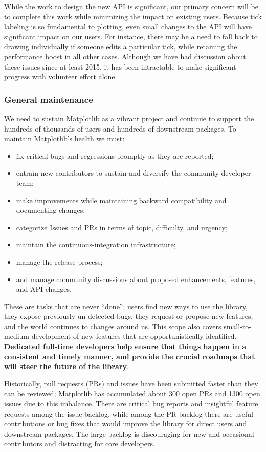 \documentclass[12pt]{article}
\numberwithin{page}{section}
\begin{document}
While the work to design the new API is significant, our primary concern will be to
complete this work while minimizing the impact on existing users.
Because tick labeling is so fundamental to plotting, even small changes to the API will
have significant impact on our users.
For instance, there may be a need to fall back to drawing individually if someone edits a
particular tick, while retaining the performance boost in all other cases.
Although we have had discussion about these issues since at least 2015, it has been
intractable to make significant progress with volunteer effort alone.


\subsubsection{General maintenance}

We need to sustain Matplotlib as a vibrant project and continue to support the
hundreds of thousands of users and hundreds of downstream packages.  To maintain
Matplotlib's health we must:
\begin{itemize}[noitemsep]
\item fix critical bugs and regressions promptly as they are reported;
\item entrain new contributors to sustain and diversify the community
  developer team;
\item make improvements while maintaining backward compatibility and
  documenting changes;
\item categorize Issues and PRs in terms of topic, difficulty, and
  urgency;
\item maintain the continuous-integration infrastructure;
\item manage the release process;
\item and manage community discussions about proposed enhancements, features,
  and API changes.
\end{itemize}
These are tasks that are never ``done''; users find new ways to use the
library, they expose previously un-detected bugs, they request or propose new
features, and the world continues to changes around us.  This scope also covers
small-to-medium development of new features that are opportunistically
identified.  \textbf{Dedicated full-time developers help ensure that things
  happen in a consistent and timely manner, and provide the crucial roadmaps
  that will steer the future of the library}.


Historically, pull requests (PRs) and issues have been submitted
faster than they can be reviewed; Matplotlib has accumulated about 300
open PRs and 1300 open issues due to this imbalance. There are
critical bug reports and insightful feature requests among the issue
backlog, while among the PR backlog there are useful contributions or
bug fixes that would improve the library for direct users and
downstream packages.  The large backlog is discouraging for new and
occasional contributors and distracting for core developers.
\end{document}
